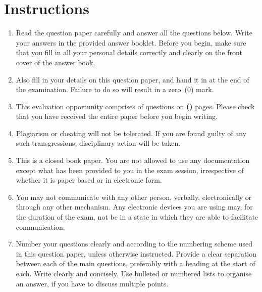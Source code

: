 
\section*{Instructions}
\begin{enumerate}
	\item Read the question paper carefully and answer all the questions below. Write your answers in the provided answer booklet. Before you begin, make sure that you fill in all your personal details correctly and clearly on the front cover of the answer book.
	
	\item Also fill in your details on this question paper, and hand it in at the end of the examination. Failure to do so will result in a zero~(0) mark.
	
	\item This evaluation opportunity comprises of \textbf{\numquestions} questions on \textbf{(\numpages)} pages. Please check that you have received the entire paper before you begin writing.
	      
	\item Plagiarism or cheating will not be tolerated. If you are found guilty of any such transgressions, disciplinary action will be taken.
	
	\item This is a closed book paper. You are not allowed to use any documentation except what has been provided to you in the exam session, irrespective of whether it is paper based or in electronic form.
	
	\item You may not communicate with any other person, verbally, electronically or through any other mechanism. Any electronic devices you are using may, for the duration of the exam, not be in a state in which they are able to facilitate communication. 
	
	\item Number your questions clearly and according to the numbering scheme used in this question paper, unless otherwise instructed. Provide a clear separation between each of the main questions, preferably with a heading at the start of each. Write clearly and concisely. Use bulleted or numbered lists to organise an answer, if you have to discuss multiple points. 
\end{enumerate}
